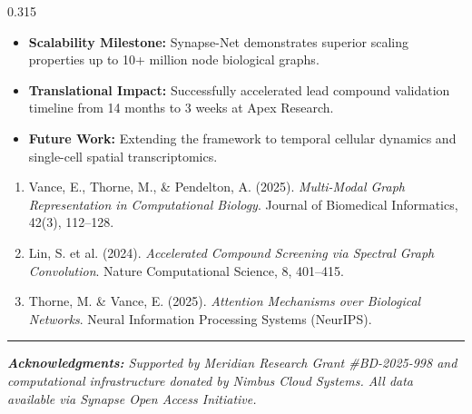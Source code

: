 \documentclass[final]{beamer}
\begin{document}
\begin{frame}[t]
\begin{columns}[t]
\begin{column}{0.315\textwidth}
    \begin{tcolorbox}[posterblock, title=\faPen\ Conclusions \& Future Directions]
      \large
      \begin{itemize}
        \item \textbf{Scalability Milestone:} Synapse-Net demonstrates superior scaling properties up to 10+ million node biological graphs.
        \item \textbf{Translational Impact:} Successfully accelerated lead compound validation timeline from 14 months to 3 weeks at Apex Research.
        \item \textbf{Future Work:} Extending the framework to temporal cellular dynamics and single-cell spatial transcriptomics.
      \end{itemize}
    \end{tcolorbox}

    \vspace{14pt}

    \begin{tcolorbox}[posterblock, title=\faFile\ Selected References \& Acknowledgments]
      \footnotesize
      \begin{enumerate}
        \item Vance, E., Thorne, M., \& Pendelton, A. (2025). \textit{Multi-Modal Graph Representation in Computational Biology}. Journal of Biomedical Informatics, 42(3), 112--128.
        \item Lin, S. et al. (2024). \textit{Accelerated Compound Screening via Spectral Graph Convolution}. Nature Computational Science, 8, 401--415.
        \item Thorne, M. \& Vance, E. (2025). \textit{Attention Mechanisms over Biological Networks}. Neural Information Processing Systems (NeurIPS).
      \end{enumerate}

      \vspace{6pt}
      \hrule
      \vspace{6pt}
      \textit{\textbf{Acknowledgments:} Supported by Meridian Research Grant \#BD-2025-998 and computational infrastructure donated by Nimbus Cloud Systems. All data available via Synapse Open Access Initiative.}
    \end{tcolorbox}

  \end{column}

\end{columns}

\end{frame}
\end{document}
